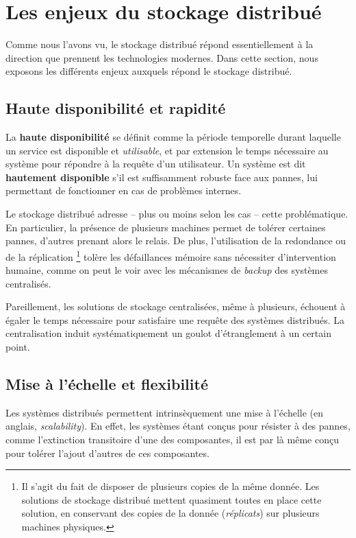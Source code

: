 \section{Les enjeux du stockage distribué}

Comme nous l'avons vu, le stockage distribué répond essentiellement à la direction que prennent les technologies modernes. Dans cette section, nous exposons les différents enjeux auxquels répond le stockage distribué.

\subsection{Haute disponibilité et rapidité}

La \textbf{haute disponibilité} se définit comme la période temporelle durant laquelle un service est disponible et \textit{utilisable}, et par extension le temps nécessaire au système pour répondre à la requête d'un utilisateur. Un système est dit \textbf{hautement disponible} s'il est suffisamment robuste face aux pannes, lui permettant de fonctionner en cas de problèmes internes.

Le stockage distribué adresse -- plus ou moins selon les cas -- cette problématique. En particulier, la présence de plusieurs machines permet de tolérer certaines pannes, d'autres prenant alors le relais. De plus, l'utilisation de la redondance ou de la réplication \footnote{Il s'agit du fait de disposer de plusieurs copies de la même donnée. Les solutions de stockage distribué mettent quasiment toutes en place cette solution, en conservant des copies de la donnée (\textit{réplicats}) sur plusieurs machines physiques.} tolère les défaillances mémoire sans nécessiter d'intervention humaine, comme on peut le voir avec les mécanismes de \textit{backup} des systèmes centralisés.

Pareillement, les solutions de stockage centralisées, même à plusieurs, échouent à égaler le temps nécessaire pour satisfaire une requête des systèmes distribués. La centralisation induit systématiquement un goulot d'étranglement à un certain point.
    
\subsection{Mise à l'échelle et flexibilité}

Les systèmes distribués permettent intrinsèquement une mise à l'échelle (en anglais, \textit{scalability}). En effet, les systèmes étant conçus pour résister à des pannes, comme l'extinction transitoire d'une des composantes, il est par là même conçu pour tolérer l'ajout d'autres de ces composantes.

